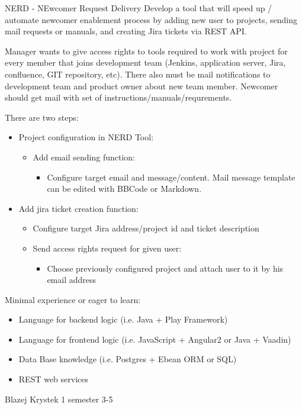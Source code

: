 \begin{project}
{NERD - NEwcomer Request Delivery}
{Develop a tool that will speed up / automate newcomer enablement process by adding new user to projects, sending mail requests or manuals, and creating Jira tickets via REST API.} 
{
Manager wants to give access rights to tools required to work with project for every member that joins development team (Jenkins, application server, Jira, confluence, GIT repository, etc). There also must be mail notifications to development team and product owner about new team member. Newcomer should get mail with set of instructions/manuals/requrements.

There are two steps:
\begin{itemize}
	\item Project configuration in NERD Tool:
		\begin{itemize}
			\item Add email sending function:
				\begin{itemize}
					\item Configure target email and message/content. Mail message template can be edited with BBCode or Markdown.
				\end{itemize}
		\end{itemize}
	\item Add jira ticket creation function:
		\begin{itemize}
			\item Configure target Jira address/project id and ticket description
			\item Send access rights request for given user:
				\begin{itemize}
					\item Choose previously configured project and attach user to it by his email address
				\end{itemize}
		\end{itemize}
\end{itemize}
}
{
Minimal experience or eager to learn:
\begin{itemize}
	\item Language for backend logic (i.e. Java + Play Framework)
	\item Language for frontend logic (i.e. JavaScript + Angular2 or Java + Vaadin)
	\item Data Base knowledge (i.e. Postgres + Ebean ORM or SQL)
	\item REST web services
\end{itemize}
}
{Blazej Krystek}
{1 semester}
{3-5}
\end{project}
